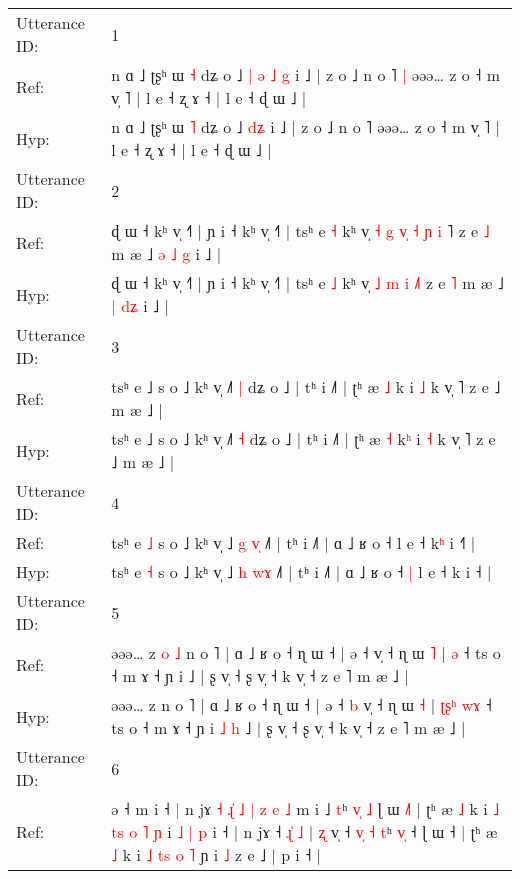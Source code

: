 \documentclass[10pt]{article}
\DeclareRobustCommand{\hl}[1]{{\textcolor{red}{#1}}}
\begin{document}
\begin{longtable}{ll}
\toprule
Utterance ID: & 1 \\
Ref: & n ɑ ˩ ʈʂʰ ɯ \hl{˧} dʑ o ˩\hl{ }\hl{|}\hl{ }\hl{ə} \hl{˩}\hl{ }\hl{g} i ˩ | z o ˩ n o ˥\hl{ }\hl{|} əəə… z o ˧ m v̩ ˥ | l e ˧ ʐ ɤ ˧ | l e ˧ ɖ ɯ ˩ |
 \\
Hyp: & n ɑ ˩ ʈʂʰ ɯ \hl{˥} dʑ o ˩\hl{}\hl{}\hl{}\hl{} \hl{}\hl{d}\hl{ʑ} i ˩ | z o ˩ n o ˥\hl{}\hl{} əəə… z o ˧ m v̩ ˥ | l e ˧ ʐ ɤ ˧ | l e ˧ ɖ ɯ ˩ |
 \\
\midrule
Utterance ID: & 2 \\
Ref: & ɖ ɯ ˧ kʰ v̩ ˧˥ | ɲ i ˧ kʰ v̩ ˧˥ | tsʰ e \hl{˧} kʰ v̩\hl{ }\hl{˧}\hl{ }\hl{g} \hl{v}\hl{̩} \hl{˧} \hl{ɲ} \hl{i}\hl{ }˥ z e \hl{˩} m æ ˩ \hl{ə} \hl{˩}\hl{ }\hl{g} i ˩ |
 \\
Hyp: & ɖ ɯ ˧ kʰ v̩ ˧˥ | ɲ i ˧ kʰ v̩ ˧˥ | tsʰ e \hl{˩} kʰ v̩\hl{}\hl{}\hl{}\hl{} \hl{}\hl{˩} \hl{m} \hl{i} \hl{}\hl{˩}˥ z e \hl{˥} m æ ˩ \hl{|} \hl{}\hl{d}\hl{ʑ} i ˩ |
 \\
\midrule
Utterance ID: & 3 \\
Ref: & tsʰ e ˩ s o ˩ kʰ v̩ ˩˥ \hl{|} dʑ o ˩ | tʰ i ˩˥ | ʈʰ æ \hl{˩} k\hl{} i \hl{˩} k v̩ ˥ z e ˩ m æ ˩ |
 \\
Hyp: & tsʰ e ˩ s o ˩ kʰ v̩ ˩˥ \hl{˧} dʑ o ˩ | tʰ i ˩˥ | ʈʰ æ \hl{˧} k\hl{ʰ} i \hl{˧} k v̩ ˥ z e ˩ m æ ˩ |
 \\
\midrule
Utterance ID: & 4 \\
Ref: & tsʰ e \hl{˩} s o ˩ kʰ v̩ ˩ \hl{g} \hl{v}\hl{̩} ˩˥ | tʰ i ˩˥ | ɑ ˩ ʁ o ˧\hl{}\hl{} l e ˧ k\hl{ʰ} i ˧\hl{˥} |
 \\
Hyp: & tsʰ e \hl{˧} s o ˩ kʰ v̩ ˩ \hl{h} \hl{w}\hl{ɤ} ˩˥ | tʰ i ˩˥ | ɑ ˩ ʁ o ˧\hl{ }\hl{|} l e ˧ k\hl{} i ˧\hl{} |
 \\
\midrule
Utterance ID: & 5 \\
Ref: & əəə… z\hl{ }\hl{o}\hl{ }\hl{˩} n o ˥ | ɑ ˩ ʁ o ˧ ɳ ɯ ˧ | ə ˧\hl{}\hl{} v̩ ˧ ɳ ɯ \hl{˥} |\hl{}\hl{}\hl{}\hl{} \hl{}\hl{ə} ˧ ts o ˧ m ɤ ˧ ɲ i\hl{}\hl{}\hl{}\hl{} ˩ | ʂ v̩ ˧ ʂ v̩ ˧ k v̩ ˧ z e ˥ m æ ˩ |
 \\
Hyp: & əəə… z\hl{}\hl{}\hl{}\hl{} n o ˥ | ɑ ˩ ʁ o ˧ ɳ ɯ ˧ | ə ˧\hl{ }\hl{b} v̩ ˧ ɳ ɯ \hl{˧} |\hl{ }\hl{ʈ}\hl{ʂ}\hl{ʰ} \hl{w}\hl{ɤ} ˧ ts o ˧ m ɤ ˧ ɲ i\hl{ }\hl{˩}\hl{ }\hl{h} ˩ | ʂ v̩ ˧ ʂ v̩ ˧ k v̩ ˧ z e ˥ m æ ˩ |
 \\
\midrule
Utterance ID: & 6 \\
Ref: & ə ˧ m i ˧\hl{ }\hl{|} n jɤ \hl{˧} \hl{ɻ}\hl{̍}\hl{ }\hl{˩}\hl{ }\hl{|} \hl{z} \hl{e} \hl{˩} m i ˩ \hl{}\hl{t}ʰ \hl{v}\hl{̩} \hl{˩} ɭ ɯ \hl{˩}˥ | ʈʰ æ \hl{˩} k i \hl{˩} \hl{t}\hl{s}\hl{ }\hl{o}\hl{ }\hl{˥} \hl{ɲ} i\hl{ }\hl{˩} \hl{|} \hl{p} i ˧ | n jɤ ˧\hl{ }\hl{ɻ}\hl{̍}\hl{ }\hl{˩} | \hl{ʐ} v̩ ˧ \hl{v}\hl{̩} \hl{˧}\hl{ }\hl{t}ʰ \hl{v}\hl{̩} ˧ ɭ ɯ ˧\hl{ }\hl{|} ʈʰ æ \hl{˩} k i \hl{˩} \hl{}\hl{t}\hl{s} \hl{o} \hl{˥} ɲ i \hl{˩} z e ˩ | p i ˧ |

\end{longtable}
\end{document}
